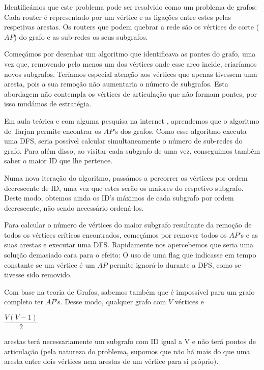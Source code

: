 \documentclass[12pt]{article}
\begin{document}
{    %
    \par
    Identificámos que este problema pode ser resolvido como um problema de grafos:
    Cada router é representado por um vértice e as ligações entre estes pelas respetivas 
    arestas. Os routers que podem quebrar a rede são os vértices de corte ($AP$)
    do grafo e as sub-redes os seus subgrafos.
    \par\bigskip
    Começámos por desenhar um algoritmo que identificava as pontes do grafo, uma vez
    que, removendo pelo menos um dos vértices onde esse arco incide, criaríamos novos 
    subgrafos. Teríamos especial atenção aos vértices que apenas tivessem uma aresta,
    pois a sua remoção não aumentaria o número de subgrafos. Esta abordagem não contempla
    os vértices de articulação que não formam pontes, por isso mudámos de estratégia.
    \par
    Em aula teórica e com alguma pesquisa na internet\cite{geeksforgeeks, hackerearth}
    , aprendemos que o algoritmo de 
    Tarjan permite encontrar os $AP$'s dos grafos. Como esse algoritmo executa uma DFS, 
    seria possível calcular simultaneamente o número de sub-redes do grafo. Para além disso,
    ao visitar cada subgrafo de uma vez, conseguimos também saber o maior ID que lhe pertence.
    \par
    Numa nova iteração do algoritmo, passámos a percorrer os vértices por ordem decrescente de 
    ID, uma vez que estes serão os maiores do respetivo subgrafo. Deste modo, obtemos ainda os 
    ID's máximos de cada subgrafo por ordem decrescente, não sendo necessário ordená-los.
    \par
    Para calcular o número de vértices do maior subgrafo resultante da 
    remoção de todos os vértices críticos encontrados, começámos por  
    remover todos os $AP$'s e as suas arestas e executar uma DFS.
    Rapidamente nos apercebemos que seria uma solução demasiado cara para o efeito: O uso de uma
    flag que indicasse em tempo constante se um vértice é um $AP$ permite ignorá-lo durante a DFS,
    como se tivesse sido removido.
    
    \par\bigskip
    Com base na teoria de Grafos, sabemos também que é impossível para um grafo completo ter 
    $AP$'s. Desse modo, qualquer grafo com $V$ vértices e 
    \begin{small}$\dfrac{V(V-1)}{2}$\end{small} arestas
    terá necessariamente um subgrafo com ID igual a V e não terá pontos de articulação
    (pela natureza do problema, supomos que não há mais do que uma aresta entre dois vértices
    nem arestas de um vértice para si próprio).
}
\end{document}
